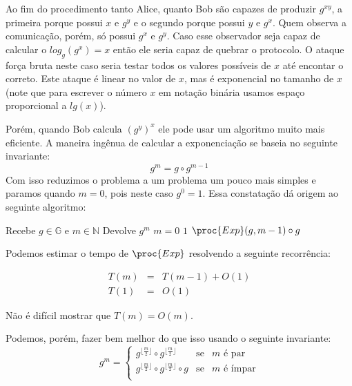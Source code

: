 Ao fim do procedimento tanto Alice, quanto Bob são capazes de produzir $g^{xy}$, a primeira porque possui $x$ e $g^y$ e o segundo porque possui $y$ e $g^x$.
Quem observa a comunicação, porém, só possui $g^x$ e $g^y$.
Caso esse observador seja capaz de calcular o $log_g(g^x) = x$ então ele seria capaz de quebrar o protocolo.
O ataque força bruta neste caso seria testar todos os valores possíveis de $x$ até encontar o correto.
Este ataque é linear no valor de $x$, mas é exponencial no tamanho de $x$ (note que para escrever o número $x$ em notação binária usamos espaço proporcional a $lg(x)$).

Porém, quando Bob calcula $(g^{y})^x$ ele pode usar um algoritmo muito mais eficiente.
A maneira ingênua de calcular a exponenciação se baseia no seguinte invariante:
\begin{displaymath}
  g^m = g \circ g^{m-1}
\end{displaymath}
Com isso reduzimos o problema a um problema um pouco mais simples e paramos quando $m = 0$, pois neste caso $g^0 = 1$.
Essa constatação dá origem ao seguinte algoritmo:

\begin{codebox}
\li \Comment Recebe $g \in \mathbb{G}$ e $m \in \mathbb{N}$
\li \Comment Devolve $g^m$
\li \If $m = 0 $
\li \Then \Return $1$
\End
\li \Return $\proc{Exp}(g, m-1) \circ g$
\End
\end{codebox}

Podemos estimar o tempo de $\proc{Exp}$ resolvendo a seguinte recorrência:

\begin{eqnarray*}
  T(m) & = & T(m - 1) + O(1)\\
  T(1) & = & O(1)
\end{eqnarray*}

Não é difícil mostrar que $T(m) = O(m)$.

Podemos, porém, fazer bem melhor do que isso usando o seguinte invariante:
\begin{displaymath}
  g^m = \left\{
    \begin{array}{lcl}
      g^{\lfloor \frac{m}{2} \rfloor} \circ  g^{\lfloor \frac{m}{2} \rfloor} & \textrm{se} & m \textrm{ é par}\\
      g^{\lfloor \frac{m}{2} \rfloor} \circ  g^{\lfloor \frac{m}{2} \rfloor} \circ g & \textrm{se} & m \textrm{ é ímpar}\\
    \end{array}
    \right.
\end{displaymath}

